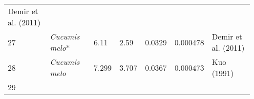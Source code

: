 \documentclass[]{article}
\begin{document}
\begin{longtable}[]{@{}lllllll@{}}
\begin{minipage}[t]{0.23\columnwidth}
Demir et al. (2011)\strut
\end{minipage}\tabularnewline
\begin{minipage}[t]{0.05\columnwidth}\raggedright
27\strut
\end{minipage} & \begin{minipage}[t]{0.23\columnwidth}\raggedright
\emph{Cucumis melo}*\strut
\end{minipage} & \begin{minipage}[t]{0.05\columnwidth}\raggedright
6.11\strut
\end{minipage} & \begin{minipage}[t]{0.08\columnwidth}\raggedright
2.59\strut
\end{minipage} & \begin{minipage}[t]{0.08\columnwidth}\raggedright
0.0329\strut
\end{minipage} & \begin{minipage}[t]{0.08\columnwidth}\raggedright
0.000478\strut
\end{minipage} & \begin{minipage}[t]{0.23\columnwidth}\raggedright
Demir et al. (2011)\strut
\end{minipage}\tabularnewline
\begin{minipage}[t]{0.05\columnwidth}\raggedright
28\strut
\end{minipage} & \begin{minipage}[t]{0.23\columnwidth}\raggedright
\emph{Cucumis melo}\strut
\end{minipage} & \begin{minipage}[t]{0.05\columnwidth}\raggedright
7.299\strut
\end{minipage} & \begin{minipage}[t]{0.08\columnwidth}\raggedright
3.707\strut
\end{minipage} & \begin{minipage}[t]{0.08\columnwidth}\raggedright
0.0367\strut
\end{minipage} & \begin{minipage}[t]{0.08\columnwidth}\raggedright
0.000473\strut
\end{minipage} & \begin{minipage}[t]{0.23\columnwidth}\raggedright
Kuo (1991)\strut
\end{minipage}\tabularnewline
\begin{minipage}[t]{0.05\columnwidth}\raggedright
29\strut
\end{minipage} & \begin{minipage}[t]{0.23\columnwidth}\raggedright

\end{minipage}
\end{longtable}
\end{document}
